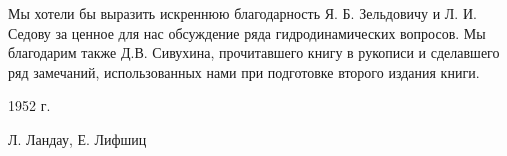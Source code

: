 Мы хотели бы выразить искреннюю благодарность Я. Б. Зельдовичу и Л. И. Седову 
за ценное для нас обсуждение ряда гидродинамических вопросов. Мы благодарим 
также Д.В. Сивухина, прочитавшего книгу в рукописи и сделавшего ряд замечаний,
использованных нами при подготовке второго издания книги.


\begin{flushright}
1952 г.

Л. Ландау, Е. Лифшиц
\end{flushright}

